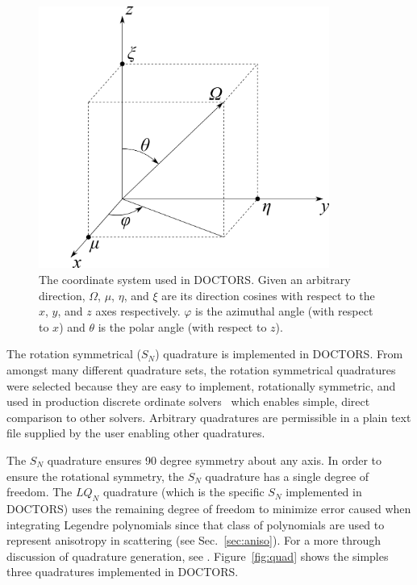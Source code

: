 \begin{figure}[tb]
  \begin{center}
   \includegraphics[width=3.75in]{figs/coord_sys}
  \end{center}
  \caption{The coordinate system used in DOCTORS. Given an arbitrary direction, $\Omega$, $\mu$, $\eta$, and $\xi$ are its direction cosines with respect to the $x$, $y$, and $z$ axes respectively. $\varphi$ is the azimuthal angle (with respect to $x$) and $\theta$ is the polar angle (with respect to $z$).}
\label{fig:coord_sys}
\end{figure}

The rotation symmetrical ($S_N$) quadrature is implemented in DOCTORS. From amongst many different quadrature sets, the rotation symmetrical quadratures were selected because they are easy to implement, rotationally symmetric, and used in production discrete ordinate solvers~\citep{ref:evanst} which enables simple, direct comparison to other solvers. Arbitrary quadratures are permissible in a plain text file supplied by the user enabling other quadratures.

The $S_N$ quadrature ensures 90 degree symmetry about any axis. In order to ensure the rotational symmetry, the $S_N$ quadrature has a single degree of freedom. The $LQ_N$ quadrature (which is the specific $S_N$ implemented in DOCTORS) uses the remaining degree of freedom to minimize error caused when integrating Legendre polynomials since that class of polynomials are used to represent anisotropy in scattering (see Sec.~\ref{sec:aniso}). For a more through discussion of quadrature generation, see \citet{ref:lewise}. Figure~\ref{fig:quad} shows the simples three quadratures implemented in DOCTORS.

